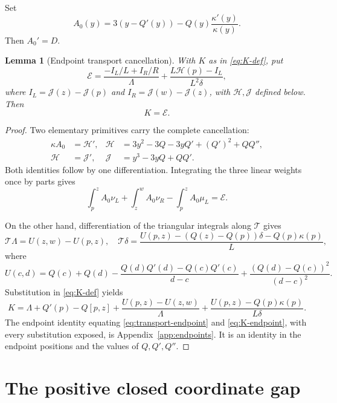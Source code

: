 \documentclass[11pt]{article}
\newtheorem{lemma}[theorem]{Lemma}
\theoremstyle{remark}
\newcommand{\T}{\mathcal{T}}
\newcommand{\appref}[1]{Appendix~\ref{#1}}
\numberwithin{equation}{section}
\begin{document}
Set
\[
 A_0(y)=3(y-Q'(y))-Q(y)\frac{\kappa'(y)}{\kappa(y)}.
\]
Then \(A_0'=D\).

\begin{lemma}[Endpoint transport cancellation]\label{lem:transport}
With \(K\) as in \eqref{eq:K-def}, put
\begin{equation}\label{eq:transport-endpoint}
 \mathcal E=
 \frac{-I_L/L+I_R/R}{\Lambda}
 +\frac{L\mathcal H(p)-I_L}{L^2\delta},
\end{equation}
where \(I_L=\mathcal J(z)-\mathcal J(p)\) and
\(I_R=\mathcal J(w)-\mathcal J(z)\), with \(\mathcal H,\mathcal J\) defined
below. Then
\begin{equation}\label{eq:transport-expectation}
 K=\mathcal E.
\end{equation}
\end{lemma}

\begin{proof}
Two elementary primitives carry the complete cancellation:
\begin{align}
 \kappa A_0&=\mathcal H',&
 \mathcal H&=3y^2-3Q-3yQ'+(Q')^2+QQ'',\label{eq:H}\\
 \mathcal H&=\mathcal J',& \mathcal J&=y^3-3yQ+QQ'.\label{eq:J}
\end{align}
Both identities follow by one differentiation. Integrating the three linear
weights once by parts gives
\begin{equation}\label{eq:expectation-endpoint}
 \int_p^z A_0\nu_L+\int_z^w A_0\nu_R-\int_p^z A_0\mu_L
 =\mathcal E.
\end{equation}

On the other hand, differentiation of the triangular integrals along \(\T\)
gives
\[
 \T\Lambda=U(z,w)-U(p,z),
\quad
 \T\delta=\frac{U(p,z)-(Q(z)-Q(p))\delta-Q(p)\kappa(p)}L,
\]
where
\begin{equation}\label{eq:U-endpoint}
 U(c,d)=Q(c)+Q(d)-\frac{Q(d)Q'(d)-Q(c)Q'(c)}{d-c}
 +\frac{(Q(d)-Q(c))^2}{(d-c)^2}.
\end{equation}
Substitution in \eqref{eq:K-def} yields
\begin{equation}\label{eq:K-endpoint}
 K=\Lambda+Q'(p)-Q[p,z]
 +\frac{U(p,z)-U(z,w)}{\Lambda}
 +\frac{U(p,z)-Q(p)\kappa(p)}{L\delta}.
\end{equation}
The endpoint identity equating \eqref{eq:transport-endpoint} and
\eqref{eq:K-endpoint}, with every substitution exposed, is
\appref{app:endpoints}. It is an identity in the endpoint positions and the
values of \(Q,Q',Q''\).
\end{proof}
\section{The positive closed coordinate gap}\label{sec:crossing}
\end{document}
